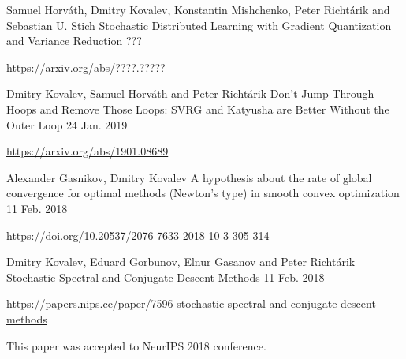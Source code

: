 
\begin{cventries}

\cventry
{Samuel Horváth, Dmitry Kovalev, Konstantin Mishchenko, Peter Richtárik and Sebastian U. Stich} %
{Stochastic Distributed Learning with Gradient Quantization and Variance Reduction} %
{} %
{???} %
{ %
	\begin{cvitems}
		\item {\url{https://arxiv.org/abs/????.?????}}
	\end{cvitems}
}

\cventry
{Dmitry Kovalev, Samuel Horváth and Peter Richtárik} %
{Don't Jump Through Hoops and Remove Those Loops: SVRG and Katyusha are Better Without the Outer Loop} %
{} %
{24 Jan. 2019} %
{ %
	\begin{cvitems}
		\item {\url{https://arxiv.org/abs/1901.08689}}
	\end{cvitems}
}


\cventry
{Alexander Gasnikov, Dmitry Kovalev	} %
{A hypothesis about the rate of global convergence for optimal methods (Newton's type) in smooth convex optimization } %
{} %
{11 Feb. 2018} %
{ %
	\begin{cvitems}
		\item {\url{https://doi.org/10.20537/2076-7633-2018-10-3-305-314}}
	\end{cvitems}
}


\cventry
{Dmitry Kovalev, Eduard Gorbunov, Elnur Gasanov and Peter Richtárik} %
{Stochastic Spectral and Conjugate Descent Methods} %
{} %
{11 Feb. 2018} %
{ %
\begin{cvitems}
\item {\url{https://papers.nips.cc/paper/7596-stochastic-spectral-and-conjugate-descent-methods}}
\item {This paper was accepted to NeurIPS 2018 conference.}
\end{cvitems}
}



\end{cventries}
